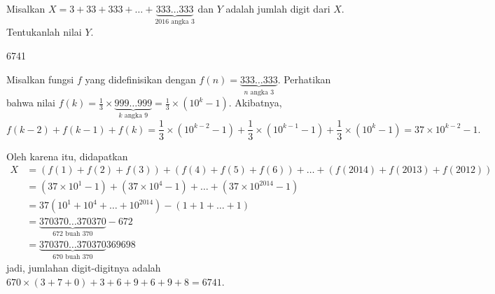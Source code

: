 \documentclass[11pt]{scrartcl}
\begin{document}
	\begin{soaljawab}
		Misalkan $X = 3 + 33 + 333 + \dots + \underbrace{333 \dots 333}_{2016 \text{ angka } 3}$ dan $Y$ adalah jumlah digit dari $X$. Tentukanlah nilai $Y$.
		
		\begin{jawaban}
		6741
		\end{jawaban}
		\begin{solusi}
		Misalkan fungsi $f$ yang didefinisikan dengan $f(n)=\underbrace{333\dots 333}_{n \text{ angka } 3}$. Perhatikan bahwa nilai $f(k)=\frac{1}{3}\times \underbrace{999 \dots 999}_{k \text{ angka } 9} = \frac{1}{3}\times (10^k-1)$. Akibatnya, $$f(k-2)+f(k-1)+f(k)=\frac{1}{3}\times (10^{k-2}-1)+\frac{1}{3}\times (10^{k-1}-1)+\frac{1}{3}\times (10^k-1)=37\times 10^{k-2}-1.$$
		
		Oleh karena itu, didapatkan 
		\begin{align*}
		X &= (f(1)+f(2)+f(3))+(f(4)+f(5)+f(6))+\dots+(f(2014)+f(2013)+f(2012)) \\
		&= (37 \times 10^1 -1)+(37 \times 10^4 -1)+ \dots + (37 \times 10^{2014}-1)\\
		&= 37(10^1+10^4+\dots+10^{2014})-(1+1+\dots+1)\\
		&= \underbrace{370370\dots 370370}_{672 \text{ buah } 370} - 672\\
		&= \underbrace{370370\dots 370370}_{670 \text{ buah } 370}369698
		\end{align*}
		jadi, jumlahan digit-digitnya adalah $670 \times (3+7+0)+3+6+9+6+9+8=6741$.
		\end{solusi}
		
		
	\end{soaljawab}
	
	
	
\end{document}
